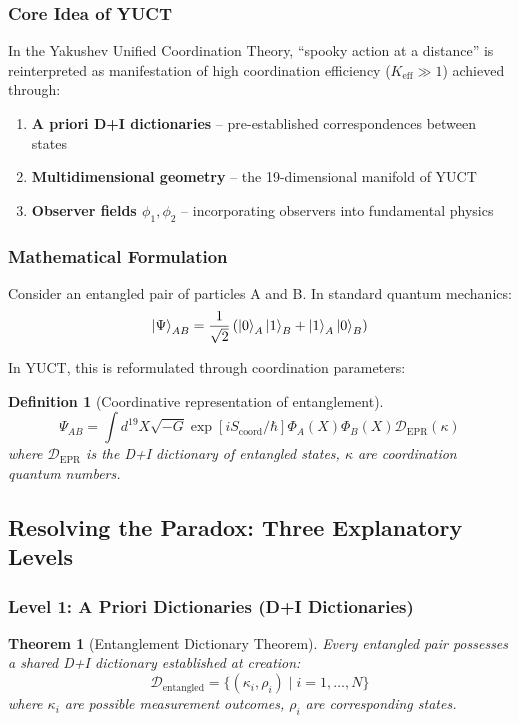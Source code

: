 \documentclass[11pt,a4paper]{article}
\newtheorem{theorem}{Theorem}
\newtheorem{definition}{Definition}
\begin{document}
	\subsubsection{Core Idea of YUCT}
	In the Yakushev Unified Coordination Theory, ``spooky action at a distance'' is reinterpreted as manifestation of high coordination efficiency ($K_{\mathrm{eff}} \gg 1$) achieved through:
	
	\begin{enumerate}
		\item \textbf{A priori D+I dictionaries} -- pre-established correspondences between states
		\item \textbf{Multidimensional geometry} -- the 19-dimensional manifold of YUCT
		\item \textbf{Observer fields $\phi_1, \phi_2$} -- incorporating observers into fundamental physics
	\end{enumerate}
	
	\subsubsection{Mathematical Formulation}
	Consider an entangled pair of particles A and B. In standard quantum mechanics:
	\begin{equation}
		\ket{\Psi}_{AB} = \frac{1}{\sqrt{2}} \left( \ket{0}_A \ket{1}_B + \ket{1}_A \ket{0}_B \right)
	\end{equation}
	
	In YUCT, this is reformulated through coordination parameters:
	
	\begin{definition}[Coordinative representation of entanglement]
		\begin{equation}
			\Psi_{AB} = \int d^{19}X \sqrt{-G} \exp\left[i S_{\text{coord}}/\hbar\right] \Phi_A(X) \Phi_B(X) \mathcal{D}_{\text{EPR}}(\kappa)
		\end{equation}
		where $\mathcal{D}_{\text{EPR}}$ is the D+I dictionary of entangled states, $\kappa$ are coordination quantum numbers.
	\end{definition}
	
	\subsection{Resolving the Paradox: Three Explanatory Levels}
	\label{subsec:three-levels}
	
	\subsubsection{Level 1: A Priori Dictionaries (D+I Dictionaries)}
	\begin{theorem}[Entanglement Dictionary Theorem]
		Every entangled pair possesses a shared D+I dictionary established at creation:
		\begin{equation}
			\mathcal{D}_{\text{entangled}} = \{(\kappa_i, \rho_i) \mid i = 1,\dots,N\}
		\end{equation}
		where $\kappa_i$ are possible measurement outcomes, $\rho_i$ are corresponding states.
	\end{theorem}
	
\end{document}
